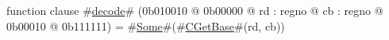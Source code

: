 function clause #\hyperref[zdecode]{decode}# (0b010010 @ 0b00000 @ rd : regno @ cb : regno @    0b00010 @ 0b111111) = #\hyperref[zSome]{Some}#(#\hyperref[zCGetBase]{CGetBase}#(rd, cb))
